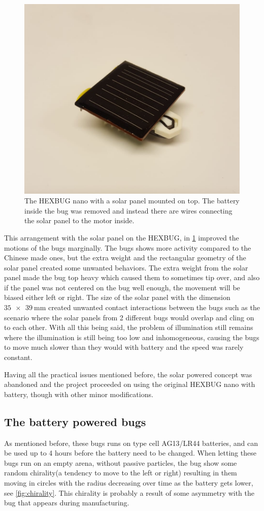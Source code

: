 \begin{figure}[htpb!]
    \centering
    \includegraphics[width=.3\textwidth]
    {figure/equipments/hexbug_solar.jpg}
    \caption{The HEXBUG nano\textregistered\xspace with a solar panel mounted on top. The battery 
    inside the bug was removed and instead there are wires connecting the solar panel to the motor inside.}
    \label{fig:hexbug_solar}
\end{figure}

This arrangement with the solar panel on the HEXBUG, in \cref{fig:hexbug_solar} improved the motions of the bugs 
marginally. The bugs shows more activity compared to the Chinese made ones, but the extra weight 
and the rectangular geometry of the solar panel created some unwanted behaviors. The extra weight from 
the solar panel made the bug top heavy which caused them to sometimes tip over, and also if the panel 
was not centered on the bug well enough, the movement will be biased either left or right. The size of 
the solar panel with the dimension $\SI[product-units = single]{35 x 39}{\milli\metre}$ created unwanted 
contact interactions between the bugs such as the scenario where the solar panels from 2 different bugs would overlap 
and cling on to each other. With all this being said, the problem of illumination still remains where the illumination is 
still being too low and inhomogeneous, causing the bugs to move much slower than they would with battery and the 
speed was rarely constant.

Having all the practical issues mentioned before, the solar powered concept was abandoned and the project proceeded 
on using the original HEXBUG nano with battery, though with other minor modifications.

\subsection{The battery powered bugs}

As mentioned before, these bugs runs on type cell AG13/LR44 batteries, and can be used up to 4 hours before 
the battery need to be changed. When letting these bugs run on an empty arena, without passive particles, 
the bug show some random chirality(a tendency to move to the left or right) resulting in them moving in circles with 
the radius decreasing over time as the battery gets lower, see \cref{fig:chirality}. This chirality is probably a result of some asymmetry 
with the bug that appears during manufacturing.

